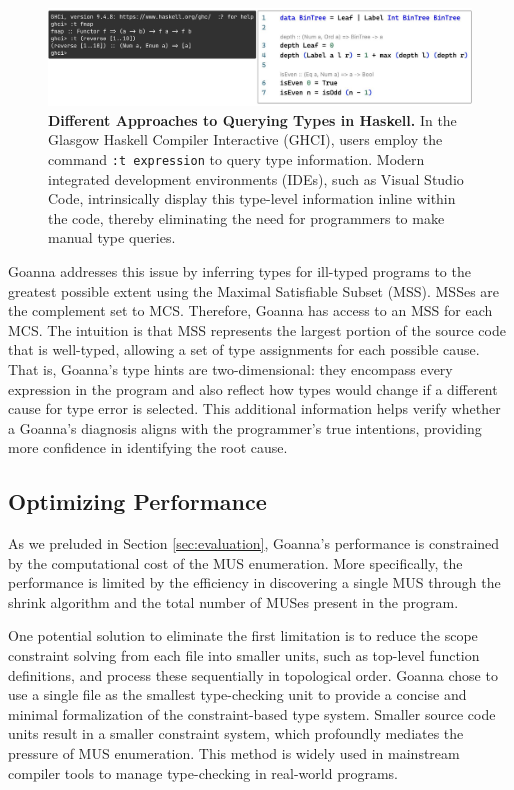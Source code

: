 \documentclass[pdflatex,lineno,sn-nature,Numbered]{sn-jnl}%
\begin{document}
\begin{figure}[hbt]
  \centering
  \includegraphics[width=\linewidth]{images/TypeHints.pdf}
  \caption{\textbf{Different Approaches to Querying Types in Haskell.} In the Glasgow Haskell Compiler Interactive (GHCI), users employ the command \texttt{:t expression} to query type information. Modern integrated development environments (IDEs), such as Visual Studio Code, intrinsically display this type-level information inline within the code, thereby eliminating the need for programmers to make manual type queries.}
  \label{fig:typehints}
\end{figure}

Goanna addresses this issue by inferring types for ill-typed programs to the greatest possible extent using the Maximal Satisfiable Subset (MSS). MSSes are the complement set to MCS. Therefore, Goanna has access to an MSS for each MCS. The intuition is that MSS represents the largest portion of the source code that is well-typed, allowing a set of type assignments for each possible cause. That is, Goanna's type hints are two-dimensional: they encompass every expression in the program and also reflect how types would change if a different cause for type error is selected. This additional information helps verify whether a Goanna's diagnosis aligns with the programmer's true intentions, providing more confidence in identifying the root cause.

\subsection{Optimizing Performance} \label{sec:optimizing-performance}

As we preluded in Section \ref{sec:evaluation}, Goanna's performance is constrained by the computational cost of the MUS enumeration. More specifically, the performance is limited by the efficiency in discovering a single MUS through the shrink algorithm and the total number of MUSes present in the program. 

One potential solution to eliminate the first limitation is to reduce the scope constraint solving from each file into smaller units, such as top-level function definitions, and process these sequentially in topological order. Goanna chose to use a single file as the smallest type-checking unit to provide a concise and minimal formalization of the constraint-based type system.  Smaller source code units result in a smaller constraint system, which profoundly mediates the pressure of MUS enumeration. This method is widely used in mainstream compiler tools to manage type-checking in real-world programs. 
\end{document}
